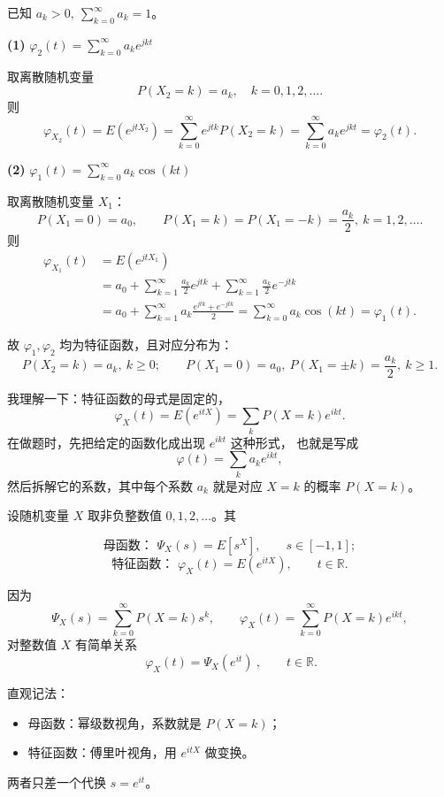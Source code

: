 \begin{solution}
已知 $a_k>0,\ \sum_{k=0}^\infty a_k=1$。

\medskip\noindent
\textbf{(1) }$\varphi_2(t)=\displaystyle\sum_{k=0}^\infty a_k e^{jkt}$

取离散随机变量
\[
P(X_2=k)=a_k,\quad k=0,1,2,\dots.
\]
则
\[
\varphi_{X_2}(t)
=E(e^{jtX_2})
=\sum_{k=0}^\infty e^{jtk}P(X_2=k)
=\sum_{k=0}^\infty a_k e^{jkt}
=\varphi_2(t).
\]

\medskip\noindent
\textbf{(2) }$\varphi_1(t)=\displaystyle\sum_{k=0}^\infty a_k\cos(kt)$

取离散随机变量 $X_1$：
\[
P(X_1=0)=a_0,\qquad
P(X_1=k)=P(X_1=-k)=\frac{a_k}{2},\ k=1,2,\dots.
\]
则
\[
\begin{aligned}
\varphi_{X_1}(t)
&=E(e^{jtX_1}) \\
&=a_0 + \sum_{k=1}^\infty \frac{a_k}{2} e^{jtk}
              + \sum_{k=1}^\infty \frac{a_k}{2} e^{-jtk} \\
&=a_0+\sum_{k=1}^\infty a_k\frac{e^{jtk}+e^{-jtk}}{2}
=\sum_{k=0}^\infty a_k\cos(kt)
=\varphi_1(t).
\end{aligned}
\]

故 $\varphi_1,\varphi_2$ 均为特征函数，且对应分布为：
\[
P(X_2=k)=a_k,\ k\ge0;\qquad
P(X_1=0)=a_0,\ P(X_1=\pm k)=\frac{a_k}{2},\ k\ge1.
\]
\end{solution}
\begin{dxtips}
    我理解一下：特征函数的母式是固定的，
\[
\varphi_X(t)=E(e^{itX})=\sum_{k}P(X=k)e^{ikt}.
\]
在做题时，先把给定的函数化成出现 $e^{ikt}$ 这种形式，
也就是写成
\[
\varphi(t)=\sum_{k} a_k e^{ikt},
\]
然后拆解它的系数，其中每个系数 $a_k$ 就是对应 $X=k$ 的概率 $P(X=k)$。
\end{dxtips}
\begin{remark}[母函数与特征函数的关系]
设随机变量 $X$ 取非负整数值 $0,1,2,\dots$。其

\[
\text{母函数： }\Psi_X(s)=E[s^X],\qquad s\in[-1,1];
\]
\[
\text{特征函数： }\varphi_X(t)=E(e^{itX}),\qquad t\in\mathbb{R}.
\]

因为
\[
\Psi_X(s)=\sum_{k=0}^{\infty}P(X=k)s^k,\qquad
\varphi_X(t)=\sum_{k=0}^{\infty}P(X=k)e^{ikt},
\]
对整数值 $X$ 有简单关系
\[
\boxed{\ \varphi_X(t)=\Psi_X(e^{it})\ },\qquad t\in\mathbb{R}.
\]

直观记法：
\begin{itemize}
  \item 母函数：幂级数视角，系数就是 $P(X=k)$；
  \item 特征函数：傅里叶视角，用 $e^{itX}$ 做变换。
\end{itemize}
两者只差一个代换 $s=e^{it}$。
\end{remark}
